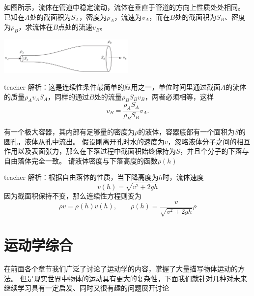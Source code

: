 \begin{example}
如图所示，流体在管道中稳定流动，流体在垂直于管道的方向上性质处处相同。
已知在$A$处的截面积为$S_A$，密度为$\rho_A$，流速为$v_A$，而在$B$处的截面积为$S_B$、密度为$\rho_B$，求流体在$B$点处的流速$v_B$。
\begin{flushright}
\includegraphics[width = 0.5\textwidth]{images/motion-47.pdf} 
\end{flushright}
\begin{taggedblock}{teacher}
\noindent
解析：这是连续性条件最简单的应用之一，单位时间里通过截面$A$的流体的质量$\rho_Av_AS_A$，同样的通过$B$处的流量$\rho_BS_Bv_B$，两者必须相等，这样
\[  v_B = \frac{\rho_A S_A}{\rho_B S_B}v_A. \]
\end{taggedblock}
\end{example}

\begin{example}
有一个极大容器，其内部有足够量的密度为$\rho$的液体，容器底部有一个面积为$S$的圆孔，液体从孔中流出。
假设刚离开孔时水的速度为$v$，忽略液体分子之间的相互作用以及表面张力，那么在下落过程中截面积始终保持为$S$，并且个分子的下落与自由落体完全一致。
请液体密度与下落高度的函数$\rho(h)$
\begin{taggedblock}{teacher}
\newline
解析：根据自由落体的性质，当下降高度为$h$时，流体速度
\[v(h)=\sqrt{v^2+2gh}\]
因为截面积保持不变，那么连续性方程则变为
\[\rho v = \rho(h)v(h),\qquad \rho(h) = \frac{ v}{\sqrt{v^2+2gh}}\rho \]
\end{taggedblock}
\end{example}



\section{运动学综合}
在前面各个章节我们广泛了讨论了运动学的内容，掌握了大量描写物体运动的方法。
但是现实世界中物体的运动具有更大的复杂性，下面我们就针对几种对未来继续学习具有一定启发、同时又很有趣的问题展开讨论






